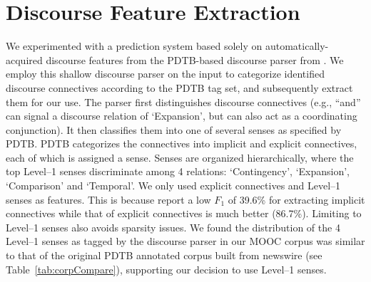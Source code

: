 \documentclass[letterpaper]{article}
\begin{document}

\section{Discourse Feature Extraction}
\label{sect:feature}

We experimented with a prediction system based solely on
automatically-acquired discourse features from the PDTB-based discourse
parser from \cite{Lin2014}.
We employ this shallow discourse parser on the input to categorize identified discourse connectives
according to the PDTB tag set, and subsequently extract them for our use.
The parser first distinguishes discourse connectives (e.g., ``and'' can signal 
a discourse relation of `Expansion', but can also act as a coordinating conjunction). It then 
classifies them into one of several senses as specified by PDTB. PDTB 
categorizes the connectives into implicit and explicit connectives, each of 
which is assigned a sense. Senses are organized hierarchically, where the top 
Level--1 senses discriminate among 4 relations: `Contingency', `Expansion', `Comparison' and `Temporal'. We only used explicit connectives and Level--1 
senses as features. This is because \cite{Lin2014} report a low $F_1$ of 
39.6\% for extracting implicit connectives while that of explicit 
connectives is much better (86.7\%). Limiting to Level--1 senses also 
avoids sparsity issues. We found the distribution of the 4 Level--1 senses
as tagged by the discourse parser 
in our MOOC corpus was similar to that of the original PDTB annotated 
corpus built from 
newswire (see Table~\ref{tab:corpCompare}), supporting our decision to
use Level--1 senses. 
\end{document}
